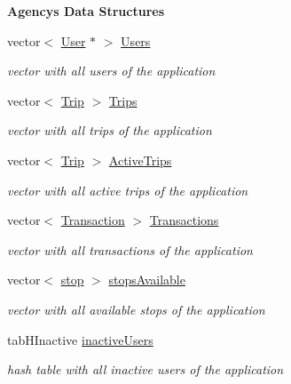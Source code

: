 \begin{Indent}\textbf{ Agency\textquotesingle{}s Data Structures}\par
\begin{DoxyCompactItemize}
\item 
vector$<$ \hyperlink{class_user}{User} $\ast$ $>$ \hyperlink{group___agency_gabb9747ae5d2295ed8bbbc6a8a5e999c4}{Users}
\begin{DoxyCompactList}\small\item\em vector with all users of the application \end{DoxyCompactList}\item 
vector$<$ \hyperlink{class_trip}{Trip} $>$ \hyperlink{group___agency_gabf415574ea1affe9c8d956d414d8ae2f}{Trips}
\begin{DoxyCompactList}\small\item\em vector with all trips of the application \end{DoxyCompactList}\item 
vector$<$ \hyperlink{class_trip}{Trip} $>$ \hyperlink{group___agency_gaa139f4e94c0d903fe15541b17286f1ab}{Active\+Trips}
\begin{DoxyCompactList}\small\item\em vector with all active trips of the application \end{DoxyCompactList}\item 
vector$<$ \hyperlink{class_transaction}{Transaction} $>$ \hyperlink{group___agency_ga238bb9d83a344aab5b299ee39cb592fa}{Transactions}
\begin{DoxyCompactList}\small\item\em vector with all transactions of the application \end{DoxyCompactList}\item 
vector$<$ \hyperlink{structstop}{stop} $>$ \hyperlink{group___agency_ga5d27f85795249e51708fdc5b913678f3}{stops\+Available}
\begin{DoxyCompactList}\small\item\em vector with all available stops of the application \end{DoxyCompactList}\item 
tab\+H\+Inactive \hyperlink{group___agency_ga4057f2249af0d7929b717f626c962aee}{inactive\+Users}
\begin{DoxyCompactList}\small\item\em hash table with all inactive users of the application \end{DoxyCompactList}\item 

\end{DoxyCompactItemize}
\end{Indent}

